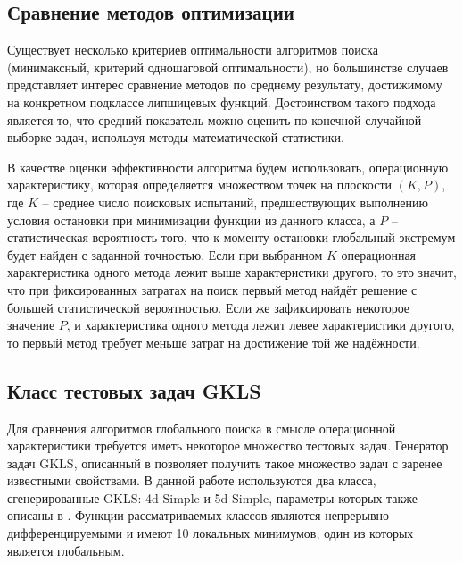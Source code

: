 \subsection{Сравнение методов оптимизации}
Существует несколько критериев оптимальности алгоритмов поиска (минимаксный, критерий одношаговой оптимальности), но большинстве случаев представляет интерес
сравнение методов по среднему результату, достижимому на конкретном подклассе липшицевых функций. Достоинством такого подхода является то, что средний показатель можно оценить
по конечной случайной выборке задач, используя методы математической статистики.
\par
В качестве оценки эффективности алгоритма будем использовать, операционную характеристику, которая определяется множеством точек на плоскости \((K, P)\),
где \(K\) – среднее число поисковых испытаний, предшествующих выполнению условия остановки при минимизации функции из данного класса, а \(P\) – статистическая вероятность того,
что к моменту остановки глобальный экстремум будет найден с заданной точностью. Если при выбранном \(K\) операционная характеристика одного метода лежит выше характеристики другого,
то это значит, что при фиксированных затратах на поиск первый метод найдёт решение с большей статистической вероятностью. Если же зафиксировать некоторое значение \(P\), и
характеристика одного метода лежит левее характеристики другого, то первый метод требует меньше затрат на достижение той же надёжности.
\subsection{Класс тестовых задач GKLS}
Для сравнения алгоритмов глобального поиска в смысле операционной характеристики требуется иметь некоторое множество тестовых задач.
Генератор задач GKLS, описанный в \cite{gklsBook} позволяет получить такое множество задач с заренее известными свойствами.
В данной работе используются два класса, сгенерированные GKLS: 4d Simple и 5d Simple, параметры которых также описаны в \cite{gklsBook}. Функции рассматриваемых классов являются непрерывно
дифференцируемыми и имеют 10 локальных минимумов, один из которых является глобальным.
